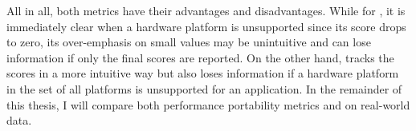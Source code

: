 All in all, both metrics have their advantages and disadvantages. 
While for \pp, it is immediately clear when a hardware platform is unsupported since its score drops to zero, its over-emphasis on small values may be unintuitive and can lose information if only the final scores are reported. 
On the other hand, \mpp tracks the scores in a more intuitive way but also loses information if a hardware platform in the set of all platforms is unsupported for an application. 
In the remainder of this thesis, I will compare both performance portability metrics \pp and \mpp on real-world data.
